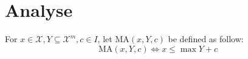 \chapter{Analyse}

For $x\in \mathcal{X},Y\subseteq\mathcal{X}^m,c\in I$, let $\text{MA}(x,Y,c)$ be defined as follow:
$$
\text{MA}(x,Y,c)\iff x\le \max Y+c
$$